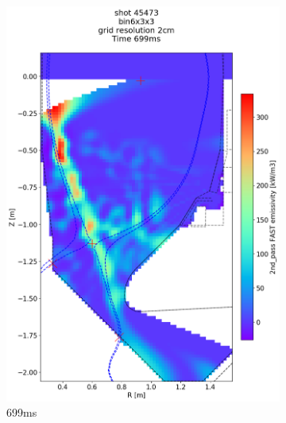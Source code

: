 \begin{figure}
\begin{subfigure}{0.355\linewidth}
         \includegraphics[trim={75 90 0 190},clip,width=\textwidth]{Chapters/chapter2/figs/IRVB-MASTU_shot-45473_export_75.png}
         \vspace*{-6.5mm}
         \caption{699ms}
         \label{fig:45473_export2_4}
     \end{subfigure}
     \begin{subfigure}{0.395\linewidth}
         \centering

\end{subfigure}
\end{figure}
